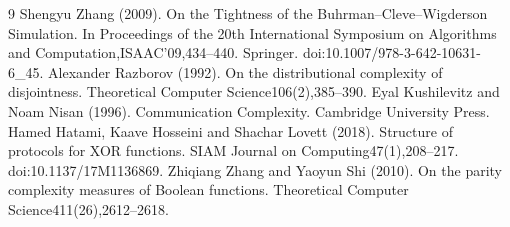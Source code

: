 \documentclass[10pt,a4paper]{article}
\begin{document}
\begin{thebibliography}{9}
 Shengyu Zhang (2009). On the Tightness of the Buhrman--Cleve--Wigderson Simulation. In Proceedings of the 20th International Symposium on Algorithms and Computation,ISAAC'09,434--440. Springer. doi:10.1007/978-3-642-10631-6\_45.
 Alexander Razborov (1992). On the distributional complexity of disjointness. Theoretical Computer Science106(2),385--390.
 Eyal Kushilevitz and Noam Nisan (1996). Communication Complexity. Cambridge University Press.
 Hamed Hatami, Kaave Hosseini and Shachar Lovett (2018). Structure of protocols for XOR functions. SIAM Journal on Computing47(1),208--217. doi:10.1137/17M1136869.
 Zhiqiang Zhang and Yaoyun Shi (2010). On the parity complexity measures of Boolean functions. Theoretical Computer Science411(26),2612--2618.
\end{thebibliography}
\end{document}
